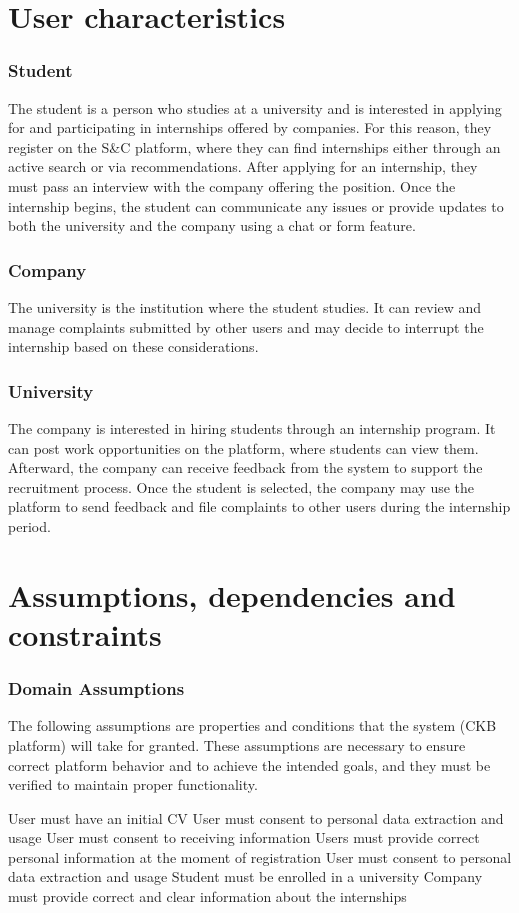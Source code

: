 \section{User characteristics}

\subsubsection*{Student}
The student is a person who studies at a university and is interested in applying for and participating in internships offered by companies. For this reason, they register on the S\&C platform, where they can find internships either through an active search or via recommendations. After applying for an internship, they must pass an interview with the company offering the position. Once the internship begins, the student can communicate any issues or provide updates to both the university and the company using a chat or form feature.
\subsubsection*{Company}
The university is the institution where the student studies. It can review and manage complaints submitted by other users and may decide to interrupt the internship based on these considerations.

\subsubsection*{University}
The company is interested in hiring students through an internship program. It can post work opportunities on the platform, where students can view them. Afterward, the company can receive feedback from the system to support the recruitment process. Once the student is selected, the company may use the platform to send feedback and file complaints to other users during the internship period.


\section{Assumptions, dependencies and constraints}

\subsubsection*{Domain Assumptions}
The following assumptions are properties and conditions that the system (CKB platform) will take for granted. These assumptions are necessary to ensure correct platform behavior and to achieve the intended goals, and they must be verified to maintain proper functionality.
\begin{domainlist}
    \item User must have an initial CV
    \itemdb User must consent to personal data extraction and usage
    \itemdc User must consent to receiving information
    \itemdd Users must provide correct personal information at the moment of registration
    \itemde User must consent to personal data extraction and usage
    \itemdf Student must be enrolled in a university
    \itemdg Company must provide correct and clear information about the internships

\end{domainlist}